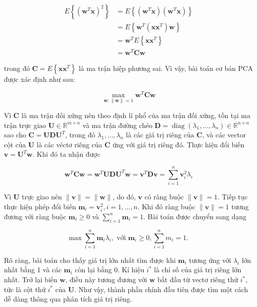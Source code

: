 \documentclass[14pt,oneside,a4paper]{report}
\numberwithin{equation}{section}
\begin{document}
$$
\begin{aligned}
E\left\{\left(\mathbf{w}^{T} \mathbf{x}\right)^{2}\right\}&=E\left\{\left(\mathbf{w}^{T} \mathbf{x}\right)\left(\mathbf{w}^{T} \mathbf{x}\right)\right\}\\
&=E\left\{\mathbf{w}^{T}\left(\mathbf{x} \mathbf{x}^{T}\right) \mathbf{w}\right\}\\
& =\mathbf{w}^{T} E\left\{\mathbf{x} \mathbf{x}^{T}\right\} \\
& =\mathbf{w}^{T} \mathbf{C} \mathbf{w}
\end{aligned}
$$

trong đó $\mathbf{C}=E\left\{\mathbf{x} \mathbf{x}^{T}\right\}$ là ma trận hiệp phương sai. Vì vậy, bài toán cơ bản $\mathrm{PCA}$ được xác định như sau:

$$
\max _{\mathbf{w}:\|\mathbf{w}\|=1} \mathbf{w}^{T}\mathbf{Cw}
$$

Vì $\mathbf{C}$ là ma trận đối xứng nên theo định lí phổ của ma trận đối xứng, tồn tại ma trận trực giao $\mathbf{U} \in \mathbb{R}^{m \times n}$ và ma trận đường chéo $\mathbf{D}=\operatorname{diag}\left(\lambda_{1}, \ldots, \lambda_{n}\right) \in \mathbb{R}^{n \times n}$ sao cho $\mathbf{C} = \mathbf{U} \mathbf{D} \mathbf{ U}^{T}$, trong đó $\lambda_{1}, \ldots, \lambda_{n}$ là các giá trị riêng của $\mathbf{C}$, và các vector cột của $\mathbf{U}$ là các véctơ riêng của $\mathbf{C}$ ứng với giá trị riêng đó. Thực hiện đổi biến $\mathbf{v}=\mathbf{U}^{T} \mathbf{w}$. Khi đó ta nhận được

$$
\mathbf{w}^{T} \mathbf{C} \mathbf{w}=\mathbf{w}^{T} \mathbf{U} \mathbf{D} \mathbf{U}^{T} \mathbf{w}=\mathbf{v}^{T} \mathbf{D} \mathbf{v}=\sum_{i=1}^{n} \mathbf{v}_{i}^{2} \lambda_{i}
$$

Vì $\mathbf{U}$ trực giao nên $\|\mathbf{v}\|=\|\mathbf{w}\|$, do đó, $\mathbf{v}$ có ràng buộc $\|\mathbf{v}\|=1$. Tiếp tục thực hiện phép đổi biến $\mathbf{m}_{i}=\mathbf{v}_{i}^{2}, i=1, \ldots, n$. Khi đó ràng buộc $\|\mathbf{v}\|=1$ tương đương với ràng buộc $\mathbf{m}_{i} \geq 0$ và $\sum_{i=1}^{n} \mathbf{m}_{i}=1$. Bài toán được chuyển sang dạng

$$
\max \sum_{i=1}^{n} \mathbf{m}_{i} \lambda_{i}, \text { với } \mathbf{m}_{i} \geq 0, \sum_{i=1}^{n} m_{i}=1 \text {. }
$$

Rõ ràng, bài toán cho thấy giá trị lớn nhất tìm được khi $\mathbf{m}_{i}$ tương ứng với $\lambda_{i}$ lớn nhất bằng 1 và các $\mathbf{m}_{i}$ còn lại bằng 0. Kí hiệu $i^{*}$ là chỉ số của giá trị riêng lớn nhất. Trở lại biến $\mathbf{w}$, điều này tương đương với $\mathbf{w}$ bắt đầu từ vectơ riêng thứ $i^{*}$, tức là cột thứ $i^{*}$ của $\mathbf{U}$. Như vậy, thành phần chính đầu tiên được tìm một cách dễ dàng thông qua phân tích giá trị riêng.
\end{document}

